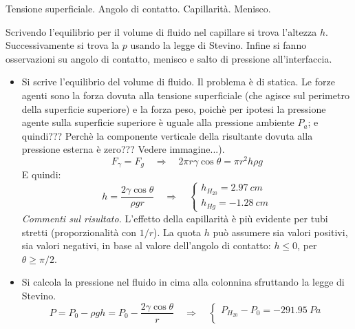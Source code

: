\sol

\partone
 Tensione superficiale. Angolo di contatto. Capillarità. Menisco.

\parttwo
 Scrivendo l'equilibrio per il volume di fluido nel capillare si trova l'altezza $h$.
Successivamente si trova la $p$ usando la legge di Stevino. Infine si fanno osservazioni su angolo di contatto,
menisco e salto di pressione all'interfaccia.
%
\begin{itemize}
\item Si scrive l'equilibrio del volume di fluido. Il problema è di statica. Le forze agenti sono la forza
dovuta alla tensione superficiale (che agisce sul perimetro della superficie superiore) e la forza peso, poichè per ipotesi la pressione agente sulla superficie superiore è uguale alla pressione ambiente $P_a$; e quindi??? Perchè la componente verticale della risultante dovuta alla pressione esterna è zero??? Vedere immagine...).
%
\begin{equation}
  F_{\gamma} = F_g \quad \Rightarrow \quad 2\pi r \gamma  \cos \theta = \pi r^2 h \rho g
\end{equation}
%
E quindi: 
\begin{equation}
  h = \frac{2 \gamma \cos \theta}{\rho g r}
  \quad \Rightarrow \quad
  \begin{cases}
    h_{H_20} = 2.97 \ cm \\
    h_{Hg} = -1.28 \ cm
  \end{cases}
\end{equation}
%
\textit{Commenti sul risultato.} L'effetto della capillarità è più evidente per tubi stretti (proporzionalità con $1/r$). La quota $h$ può assumere sia valori positivi, sia valori negativi, 
in base al valore dell'angolo di contatto: $h \le 0$, per $\theta \ge \pi/2$.
%
%
\item Si calcola la pressione nel fluido in cima alla colonnina sfruttando la legge di Stevino.
\begin{equation}
  P = P_0 - \rho g h = P_0 - \frac{2 \gamma \cos \theta}{r}
  \quad \Rightarrow \quad
  \begin{cases}
    P_{H_20} - P_0 =  - 291.95 \ Pa \\

\end{cases}
\end{equation}
\end{itemize}

